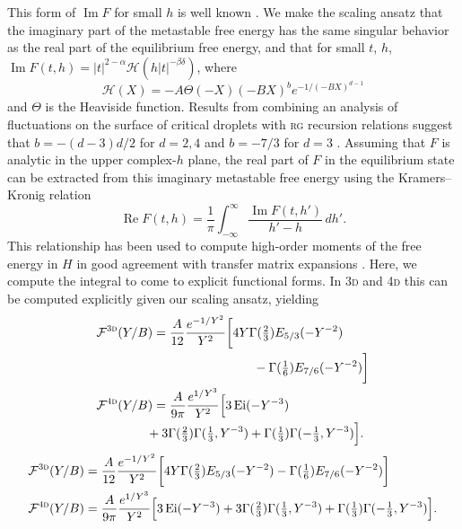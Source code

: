 \documentclass[aps,prl,reprint]{revtex4-1}
\def\[{\begin{equation}}
\def\]{\end{equation}}
\def\ei{\mathop{\mathrm{Ei}}\nolimits} %
\def\re{\mathop{\mathrm{Re}}\nolimits}
\def\im{\mathop{\mathrm{Im}}\nolimits}
\def\dd{d} %
\def\fF{\mathcal F}  %
\def\fiF{\mathcal H} %
\def\dim{d}
\def\threedee{\textsc{3d} }
\def\fourdee{\textsc{4d} }
\newif\ifreprint
\begin{document}
This form of $\im F$ for small $h$ is well known
\cite{langer.1967.condensation,harris.1984.metastability}.  We make the
scaling ansatz that the imaginary part of the metastable free energy has the
same singular behavior as the real part of the equilibrium free energy, and
that for small $t$, $h$, $\im F(t,h)=|t|^{2-\alpha}\fiF(h|t|^{-\beta\delta})$,
where
\[
  \fiF(X)=-A\Theta(-X)(-BX)^be^{-1/(-BX)^{\dim-1}}
  \label{eq:im.scaling}
\]
and $\Theta$ is the Heaviside function. Results from combining an analysis of
fluctuations on the surface of critical droplets with \textsc{rg} recursion
relations suggest that $b=-(d-3)d/2$ for $d=2,4$ and $b=-7/3$ for $d=3$
\cite{houghton.1980.metastable,rudnick.1976.equations,gunther.1980.goldstone}.
Assuming that $F$ is analytic in the upper complex-$h$ plane, the real part of
$F$ in the equilibrium state can be extracted from this imaginary metastable
free energy using the Kramers--Kronig relation
\[
  \re F(t,h)=\frac1\pi\int_{-\infty}^\infty\frac{\im F(t,h')}{h'-h}\,\dd h'.
  \label{eq:kram-kron}
\]
This relationship has been used to compute high-order moments of the free
energy in $H$ in good agreement with transfer matrix expansions
\cite{lowe.1980.instantons}. Here, we compute the integral to come to explicit
functional forms.  In \threedee and \fourdee this can be computed explicitly
given our scaling ansatz, yielding
\def\eqthreedeeone{
  \fF^\threedee(Y/B)&=
  \frac{A}{12}\frac{e^{-1/Y^2}}{Y^2}
  \bigg[4Y\Gamma(\tfrac23)E_{5/3}(-Y^{-2})
}
\def\eqthreedeetwo{
  -\Gamma(\tfrac16)E_{7/6}(-Y^{-2})\bigg]
}
\def\eqfourdeeone{
  \fF^\fourdee(Y/B)&=
  \frac{A}{9\pi}\frac{e^{1/Y^3}}{Y^2}
  \Big[3\ei(-Y^{-3})
}
\def\eqfourdeetwo{
  +3\Gamma(\tfrac23)\Gamma(\tfrac13,Y^{-3})
  +\Gamma(\tfrac13)\Gamma(-\tfrac13,Y^{-3})\Big]
}
\ifreprint
\begin{align}
  &\begin{aligned}
    \eqthreedeeone\\
    &\hspace{8em}
    \eqthreedeetwo
  \end{aligned}
  \\
  &\begin{aligned}
    \eqfourdeeone
    \\
    &\hspace{-0.5em}
    \eqfourdeetwo.
  \end{aligned}
\end{align}
\else
\begin{align}
  \eqthreedeeone\eqthreedeetwo
  \\
  \eqfourdeeone\eqfourdeetwo.
\end{align}
\end{document}
